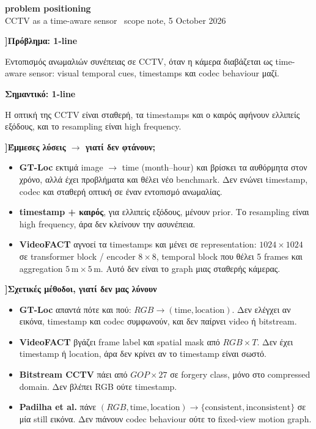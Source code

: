 \documentclass[11pt,a4paper]{article}
\newcommand{\slot}[1]{%
  \par\vspace{0.72em}%
  {\sffamily\bfseries\color{accent}\large ]\enspace #1}\par\vspace{0.18em}%
}
\newcommand{\subslot}[1]{%
  \par\vspace{0.15em}\hspace{1.15em}%
  {\sffamily\bfseries\color{accent}#1}\par\vspace{0.12em}%
}
\begin{document}
\begin{center}
{\sffamily\bfseries\LARGE problem positioning}\\[0.25em]
{\footnotesize\color{accent} CCTV as a time-aware sensor \textbar\ scope note, 5 October 2026}
\end{center}

\slot{Πρόβλημα: 1-line}

Εντοπισμός ανωμαλιών συνέπειας σε CCTV, όταν η κάμερα διαβάζεται ως time-aware sensor: visual temporal cues, timestamps και codec behaviour μαζί.

\subslot{Σημαντικό: 1-line}

Η οπτική της CCTV είναι σταθερή, τα timestamps και ο καιρός αφήνουν ελλιπείς εξόδους, και το resampling είναι high frequency.

\slot{Έμμεσες λύσεις $\rightarrow$ γιατί δεν φτάνουν;}

\begin{itemize}
  \item \textbf{GT-Loc} εκτιμά image $\rightarrow$ time (month--hour) και βρίσκει τα αυθόρμητα στον χρόνο, αλλά έχει προβλήματα και θέλει νέο benchmark. Δεν ενώνει timestamp, codec και σταθερή οπτική σε έναν εντοπισμό ανωμαλίας.
  \item \textbf{timestamp + καιρός}, για ελλιπείς εξόδους, μένουν prior. Το resampling είναι high frequency, άρα δεν κλείνουν την ασυνέπεια.
  \item \textbf{VideoFACT} αγνοεί τα timestamps και μένει σε representation: $1024\times1024$ σε transformer block / encoder $8\times8$, temporal block που θέλει 5 frames και aggregation $5\,\mathrm{m}\times5\,\mathrm{m}$. Αυτό δεν είναι το graph μιας σταθερής κάμερας.
\end{itemize}

\slot{Σχετικές μέθοδοι, γιατί δεν μας λύνουν}

\begin{itemize}
  \item \textbf{GT-Loc} απαντά πότε και πού: \(RGB \rightarrow (\mathrm{time},\mathrm{location})\). Δεν ελέγχει αν εικόνα, timestamp και codec συμφωνούν, και δεν παίρνει video ή bitstream.
  \item \textbf{VideoFACT} βγάζει frame label και spatial mask από \(RGB \times T\). Δεν έχει timestamp ή location, άρα δεν κρίνει αν το timestamp είναι σωστό.
  \item \textbf{Bitstream CCTV} πάει από \(GOP \times 27\) σε forgery class, μόνο στο compressed domain. Δεν βλέπει RGB ούτε timestamp.
  \item \textbf{Padilha et al.} πάνε \((RGB,\mathrm{time},\mathrm{location}) \rightarrow \{\mathrm{consistent},\mathrm{inconsistent}\}\) σε μία still εικόνα. Δεν πιάνουν codec behaviour ούτε το fixed-view motion graph.
\end{itemize}
\end{document}
